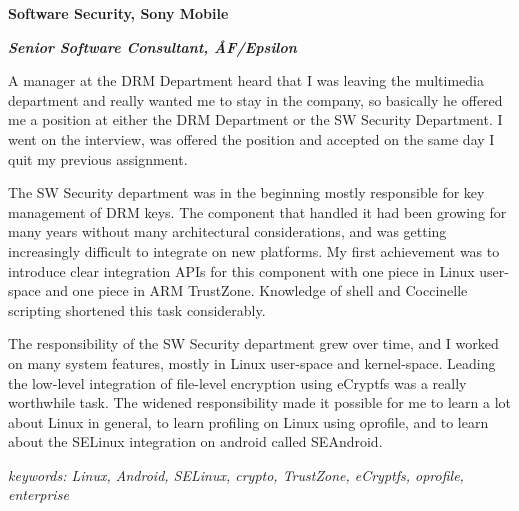 \item[2012-2014] \textbf{Software Security, Sony Mobile}

\textit{\textbf{Senior Software Consultant, ÅF/Epsilon}}

A manager at the DRM Department heard that I was leaving the multimedia department and really wanted me to stay in the company, so basically he offered me a position at either the DRM Department or the SW Security Department. I went on the interview, was offered the position and accepted on the same day I quit my previous assignment.

The SW Security department was in the beginning mostly responsible for key management of DRM keys. The component that handled it had been growing for many years without many architectural considerations, and was getting increasingly difficult to integrate on new platforms. My first achievement was to introduce clear integration APIs for this component with one piece in Linux user-space and one piece in ARM TrustZone. Knowledge of shell and Coccinelle scripting shortened this task considerably.

The responsibility of the SW Security department grew over time, and I worked on many system features, mostly in Linux user-space and kernel-space. Leading the low-level integration of file-level encryption using eCryptfs was a really worthwhile task. The widened responsibility made it possible for me to learn a lot about Linux in general, to learn profiling on Linux using oprofile, and to learn about the SELinux integration on android called SEAndroid.

\textit{keywords: Linux, Android, SELinux, crypto, TrustZone, eCryptfs, oprofile, enterprise}